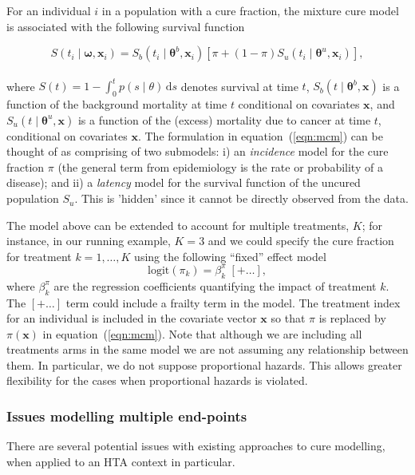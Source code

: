 \documentclass[AMA,STIX1COL]{WileyNJD-v2}
\begin{document}
For an individual $i$ in a population with a cure fraction, the mixture cure model is associated with the following survival function

\begin{equation}
\label{eqn:mcm}
S(t_{i} \mid \bm\omega, \bm{x}_i) = S_b(t_{i} \mid \bm\theta^b, \bm{x}_{i}) \left[\pi + (1 - \pi) S_u(t_{i} \mid \bm\theta^u, \bm{x}_{i}) \right],
\end{equation}
\\
\noindent
where $S(t) = 1 \!-\! \int_0^t p(s \mid \theta)\, \text{d}s$ denotes survival at time $t$,
$S_b(t \mid \bm\theta^b, \bm{x})$ is a function of the background mortality at time $t$ conditional on covariates $\bm{x}$,
and $S_u(t \mid \bm\theta^u, \bm{x})$ is a function of the (excess) mortality due to cancer at time $t$, conditional on covariates $\bm{x}$.
The formulation in equation~(\ref{eqn:mcm}) can be thought of as comprising of two submodels: i) an \textit{incidence} model for the cure fraction $\pi$ (the general term from epidemiology is the rate or probability of a disease); and ii) a \textit{latency} model for the survival function of the uncured population $S_u$. This is 'hidden' since it cannot be directly observed from the data.

The model above can be extended to account for multiple treatments, $K$; for instance, in our running example, $K=3$ and we could specify the cure fraction for treatment $k=1,\ldots,K$ using the following ``fixed'' effect model
\begin{equation}
\label{eqn:pi_regn}
\mbox{logit}(\pi_{k}) = \beta^{\pi}_{k} \; [+ \ldots],
\end{equation}
\noindent
where $\beta^{\pi}_k$ are the regression coefficients quantifying the impact of treatment $k$.
The $[+ \ldots]$ term could include a frailty term in the model.
The treatment index for an individual is included in the covariate vector $\bm{x}$ so that $\pi$ is replaced by $\pi(\bm{x})$ in equation~(\ref{eqn:mcm}).
Note that although we are including all treatments arms in the same model we are not assuming any relationship between them. In particular, we do not suppose proportional hazards. This allows greater flexibility for the cases when proportional hazards is violated.

\subsubsection{Issues modelling multiple end-points} \label{section:issues}
There are several potential issues with existing approaches to cure modelling, when applied to an HTA context in particular.
\end{document}
